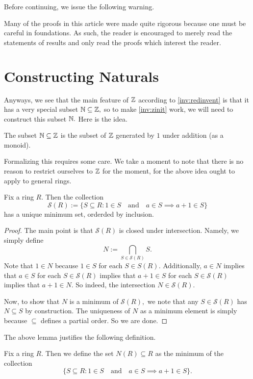 \documentclass{article}
\begin{document}
Before continuing, we issue the following warning.
\begin{warn}
	Many of the proofs in this article were made quite rigorous because one must be careful in foundations. As such, the reader is encouraged to merely read the statements of results and only read the proofs which interest the reader.
\end{warn}

\section{Constructing Naturals}
Anyways, we see that the main feature of $\mathbb Z$ according to \autoref{inv:redinvent} is that it has a very special subset $\mathbb N\subseteq\mathbb Z,$ so to make \autoref{inv:zinit} work, we will need to construct this subset $\mathbb N.$ Here is the idea.
\begin{idea} \label{idea:natural}
	The subset $\mathbb N\subseteq\mathbb Z$ is the subset of $\mathbb Z$ generated by $1$ under addition (as a monoid).
\end{idea}
Formalizing this requires some care. We take a moment to note that there is no reason to restrict ourselves to $\mathbb Z$ for the moment, for the above idea ought to apply to general rings.
\begin{lemma} \label{lem:justifynr}
	Fix a ring $R.$ Then the collection
	\[\mathcal S(R):=\{S\subseteq R:1\in S\quad\text{and}\quad a\in S\implies a+1\in S\}\]
	has a unique minimum set, orderded by inclusion.
\end{lemma}
\begin{proof}
	The main point is that $\mathcal S(R)$ is closed under intersection. Namely, we simply define
	\[N:=\bigcap_{S\in\mathcal S(R)}S.\]
	Note that $1\in N$ because $1\in S$ for each $S\in S(R).$ Additionally, $a\in N$ implies that $a\in S$ for each $S\in\mathcal S(R)$ implies that $a+1\in S$ for each $S\in\mathcal S(R)$ implies that $a+1\in N.$ So indeed, the intersection $N\in\mathcal S(R).$ 
	
	Now, to show that $N$ is a minimum of $\mathcal S(R),$ we note that any $S\in\mathcal S(R)$ has $N\subseteq S$ by construction. The uniqueness of $N$ as a minimum element is simply because $\subseteq$ defines a partial order. So we are done.
\end{proof}
The above lemma justifies the following definition.
\begin{definition}[\texorpdfstring{$N(R)$}{N(R)}]
	Fix a ring $R.$ Then we define the set $N(R)\subseteq R$ as the minimum of the collection
	\[\{S\subseteq R:1\in S\quad\text{and}\quad a\in S\implies a+1\in S\}.\]
\end{definition}
\end{document}
